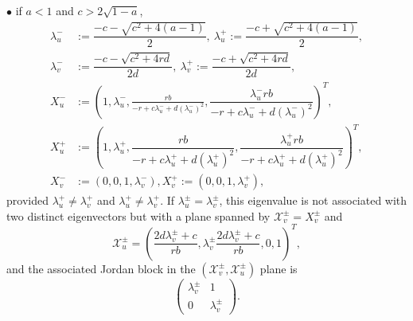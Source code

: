 \documentclass[11pt,a4paper]{article}
\numberwithin{equation}{section}
\numberwithin{figure}{section}
\begin{document}
\noindent $\bullet$ if  $a<1$ and $c>2\sqrt{1-a}$,
\begin{equation*}
\begin{aligned}
    \lambda_{u}^{-}&:= \dfrac{-c-\sqrt{c^2+4(a-1)}}{2},\ \lambda_{u}^{+}:=\dfrac{-c+\sqrt{c^2+4(a-1)}}{2},\\
    \lambda_{v}^{-}&:= \dfrac{-c-\sqrt{c^2+4rd}}{2d},\ \lambda_{v}^{+}:= \dfrac{-c+\sqrt{c^2+4rd}}{2d},\\
    X^{-}_{u}&:=\left(1, \lambda_{u}^{-}, \frac{rb}{-r+c\lambda_{u}^{-}+d(\lambda_{u}^{-})^2}, \dfrac{\lambda_{u}^{-}rb}{-r+c\lambda_{u}^{-}+d(\lambda_{u}^{-})^2}\right)^T,  \\
   X^{+}_{u}&:= \left(1, \lambda_{u}^{+}, \dfrac{rb}{-r+c\lambda_{u}^{+}+d(\lambda_{u}^{+})^2}, \dfrac{\lambda_{u}^{+}rb}{-r+c\lambda_{u}^{+}+d(\lambda_{u}^{+})^2}\right)^T,   \\
    X^{-}_{v}&:=\left(0, 0, 1, \lambda_{v}^{-}\right), X^{+}_{v}:=\left( 0, 0, 1, \lambda_{v}^{+}\right),
\end{aligned}
\end{equation*}
 provided $\lambda_{u}^{+}\neq \lambda_{v}^{+}$ and $\lambda_{u}^{+}\neq \lambda_{v}^{+}$.
If $\lambda_{u}^{\pm}=\lambda_{v}^{\pm}$, this eigenvalue is not associated with two distinct eigenvectors but with a plane spanned by $\mathcal{X}_{v}^{\pm}=X_{v}^{\pm}$ and 
\begin{equation*}%
    \mathcal{X}_{u}^{\pm} = \left(\frac{2d\lambda_{v}^{\pm}+c}{rb}, \lambda_{v}^{\pm}\frac{2d\lambda_{v}^{\pm}+c}{rb}, 0, 1\right)^T, 
\end{equation*}
and the associated Jordan block in the $(\mathcal{X}_{v}^{\pm}, \mathcal{X}_{u}^{\pm})$ plane is 
\begin{equation*}
    \begin{pmatrix}
        \lambda_{v}^{\pm} & 1 \\ 0 & \lambda_{v}^{\pm}
    \end{pmatrix}.
\end{equation*}
\end{document}
